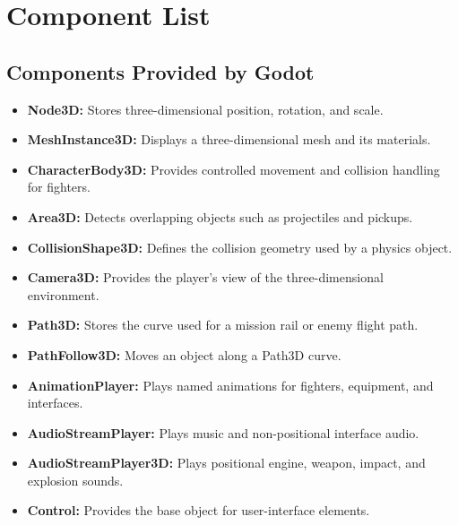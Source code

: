 \documentclass[journal]{IEEEtran}
\begin{document}
\section{Component List}

\subsection{Components Provided by Godot}

\begin{itemize}

    \item \textbf{Node3D:}
    Stores three-dimensional position, rotation, and scale.

    \item \textbf{MeshInstance3D:}
    Displays a three-dimensional mesh and its materials.

    \item \textbf{CharacterBody3D:}
    Provides controlled movement and collision handling for fighters.

    \item \textbf{Area3D:}
    Detects overlapping objects such as projectiles and pickups.

    \item \textbf{CollisionShape3D:}
    Defines the collision geometry used by a physics object.

    \item \textbf{Camera3D:}
    Provides the player's view of the three-dimensional environment.

    \item \textbf{Path3D:}
    Stores the curve used for a mission rail or enemy flight path.

    \item \textbf{PathFollow3D:}
    Moves an object along a Path3D curve.

    \item \textbf{AnimationPlayer:}
    Plays named animations for fighters, equipment, and interfaces.

    \item \textbf{AudioStreamPlayer:}
    Plays music and non-positional interface audio.

    \item \textbf{AudioStreamPlayer3D:}
    Plays positional engine, weapon, impact, and explosion sounds.

    \item \textbf{Control:}
    Provides the base object for user-interface elements.


\end{itemize}
\end{document}
